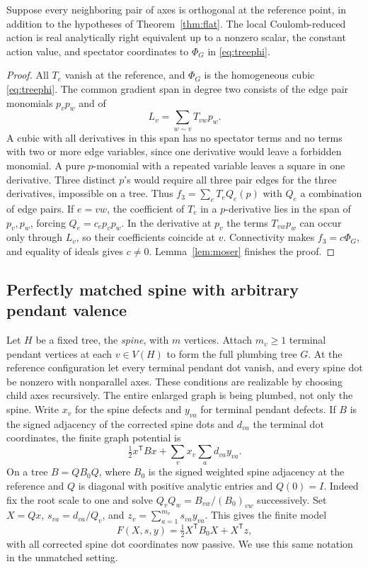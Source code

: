 \begin{theorem}\label{thm:cubic}
Suppose every neighboring pair of axes is orthogonal at the reference point, in addition to the hypotheses of Theorem~\ref{thm:flat}. The local Coulomb-reduced action is real analytically right equivalent up to a nonzero scalar, the constant action value, and spectator coordinates to \(\Phi_G\) in \eqref{eq:treephi}.
\end{theorem}
\begin{proof}
All \(T_e\) vanish at the reference, and \(\Phi_G\) is the homogeneous cubic \eqref{eq:treephi}. The common gradient span in degree two consists of the edge pair monomials \(p_vp_w\) and of
\[
                   L_v=\sum_{w\sim v} T_{vw} p_w.
\]
A cubic with all derivatives in this span has no spectator terms and no terms with two or more edge variables, since one derivative would leave a forbidden monomial. A pure \(p\)-monomial with a repeated variable leaves a square in one derivative. Three distinct \(p\)'s would require all three pair edges for the three derivatives, impossible on a tree. Thus \(f_3=\sum_e T_e Q_e(p)\) with \(Q_e\) a combination of edge pairs. If \(e=vw\), the coefficient of \(T_e\) in a \(p\)-derivative lies in the span of \(p_v,p_w\), forcing \(Q_e=c_e p_vp_w\). In the derivative at \(p_v\) the terms \(T_{vw}p_w\) can occur only through \(L_v\), so their coefficients coincide at \(v\). Connectivity makes \(f_3=c\Phi_G\), and equality of ideals gives \(c\ne0\). Lemma~\ref{lem:moser} finishes the proof.
\end{proof}

\subsection{Perfectly matched spine with arbitrary pendant valence}

Let \(H\) be a fixed tree, the \emph{spine}, with \(m\) vertices. Attach \(m_v\ge1\) terminal pendant vertices at each \(v\in V(H)\) to form the full plumbing tree \(G\). At the reference configuration let every terminal pendant dot vanish, and every spine dot be nonzero with nonparallel axes. These conditions are realizable by choosing child axes recursively. The entire enlarged graph is being plumbed, not only the spine. Write \(x_v\) for the spine defects and \(y_{va}\) for terminal pendant defects. If \(B\) is the signed adjacency of the corrected spine dots and \(d_{va}\) the terminal dot coordinates, the finite graph potential is
\[
          \tfrac12 x^{\mathsf T}B x+\sum_v x_v\sum_a d_{va}y_{va}.
\]
On a tree \(B=Q B_0 Q\), where \(B_0\) is the signed weighted spine adjacency at the reference and \(Q\) is diagonal with positive analytic entries and \(Q(0)=I\). Indeed fix the root scale to one and solve \(Q_v Q_w=B_{vw}/(B_0)_{vw}\) successively. Set \(X=Qx\), \(s_{va}=d_{va}/Q_v\), and \(z_v=\sum_{a=1}^{m_v}s_{va}y_{va}\). This gives the finite model
\begin{equation}\label{eq:finitemodel}
        F(X,s,y)=\tfrac12 X^{\mathsf T}B_0X+X^{\mathsf T}z ,
\end{equation}
with all corrected spine dot coordinates now passive. We use this same notation in the unmatched setting.

